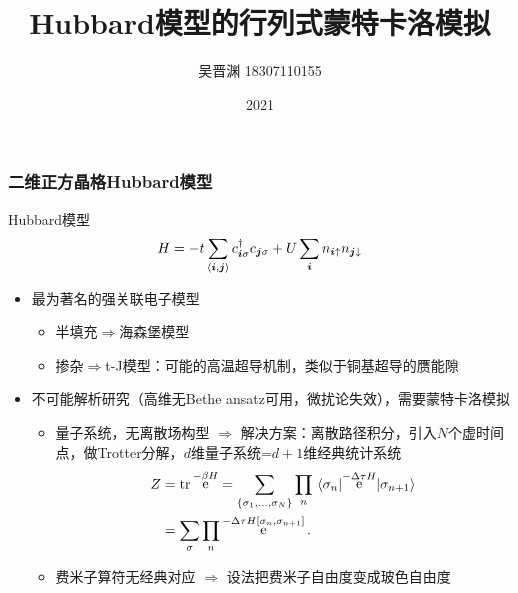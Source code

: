\documentclass[UTF8]{ctexbeamer}
\title{Hubbard模型的行列式蒙特卡洛模拟}
\author{吴晋渊 18307110155}
\institute{复旦大学物理学系}
\date{2021}
\DeclareMathOperator{\ee}{e}
\newcommand{\pair}[1]{\langle #1 \rangle}
\begin{document}
\frame{\titlepage}

\begin{frame}
\frametitle{二维正方晶格Hubbard模型}

Hubbard模型
\begin{equation}
    H = - t\sum_{\pair{\vb*{i}, \vb*{j}}} c^\dagger_{\vb*{i} \sigma} c_{\vb*{j} \sigma} + U \sum_{\vb*{i}} n_{\vb*{i} \uparrow} n_{\vb*{j} \downarrow}
\end{equation}    
\begin{itemize}
    \item 最为著名的强关联电子模型
    \begin{itemize}
        \item 半填充$\Rightarrow$海森堡模型
        \item 掺杂$\Rightarrow$t-J模型：可能的高温超导机制，类似于铜基超导的赝能隙
    \end{itemize}
    \item 不可能解析研究（高维无Bethe ansatz可用，微扰论失效），需要蒙特卡洛模拟
    \begin{itemize}
        \item 量子系统，无离散场构型 $\Rightarrow$ 解决方案：离散路径积分，引入$N$个虚时间点，做Trotter分解，$d$维量子系统=$d+1$维经典统计系统
        \begin{equation}
            \begin{aligned}
                Z &= \trace \ee^{- \beta H} = \sum_{\{ \sigma_1, \ldots, \sigma_N \}} \prod_{n} \mel{\sigma_n}{\ee^{- \Delta \tau H}}{\sigma_{n+1}} \\
                &= \sum_\sigma \prod_n \ee^{- \Delta \tau H[\sigma_n, \sigma_{n+1}]}.
            \end{aligned}
        \end{equation}
        \item 费米子算符无经典对应 $\Rightarrow$ 设法把费米子自由度变成玻色自由度
    \end{itemize}
\end{itemize}

\end{frame}
\end{document}

